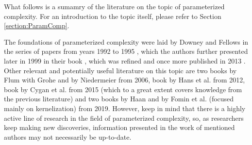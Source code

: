 What follows is a sumamry of the literature on the topic of parameterized complexity.
For an introduction to the topic itself, please refer to Section \ref{section:ParamComp}.

The foundations of parameterized complexity were laid by Downey and Fellows
in the series of papers from years 1992 to 1995 \cite{Downey1992,Downey1995.1,Downey1995.2,Downey1993,Downey1995.4},
which the authors further presented later in 1999 in their book \cite{Downey1999},
which was refined and once more published in 2013 \cite{Downey2013}.
Other relevant and potentially useful literature on this topic are
two books by Flum with Grohe \cite{Flum2006} and by Niedermeier \cite{Niedermeier2006} from 2006, book by Hans et al. \cite{Hans2012} from 2012,
book by Cygan et al. \cite{Cygan2015} from 2015 (which to a great extent covers knowledge from the previous literature)
and two books by Haan \cite{Haan2019} and by Fomin et al. (focused mainly on kernelization) \cite{Fomin2019} from 2019.
However, keep in mind that there is a highly active line of research in the field of parameterized complexity, so,
as researchers keep making new discoveries, information presented in the work of mentioned authors may not necessarily be up-to-date.
